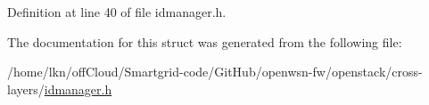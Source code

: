 Definition at line 40 of file idmanager.\+h.



The documentation for this struct was generated from the following file\+:\begin{DoxyCompactItemize}
\item 
/home/lkn/off\+Cloud/\+Smartgrid-\/code/\+Git\+Hub/openwsn-\/fw/openstack/cross-\/layers/\hyperlink{idmanager_8h}{idmanager.\+h}\end{DoxyCompactItemize}
